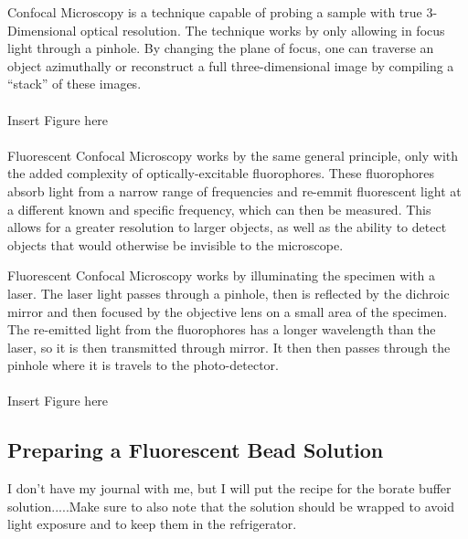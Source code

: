 

Confocal Microscopy is a technique capable of probing a sample with true 3-Dimensional optical resolution. The technique works by only allowing in focus light through a pinhole. By changing the plane of focus, one can traverse an object azimuthally or reconstruct a full three-dimensional image by compiling a ``stack'' of these images.  
\\ \\
	{\large{Insert Figure here} } 
\\ \\
Fluorescent Confocal Microscopy works by the same general principle, only with the added complexity of optically-excitable fluorophores. These fluorophores absorb light from a narrow range of frequencies and re-emmit fluorescent light at a different known and specific frequency, which can then be measured. This allows for a greater resolution to larger objects, as well as the ability to detect objects that would otherwise be invisible to the microscope.  

Fluorescent Confocal Microscopy works by illuminating the specimen with a laser. The laser light passes through a pinhole, then is reflected by the dichroic mirror and then focused by the objective lens on a small area of the specimen. The re-emitted light from the fluorophores has a longer wavelength than the laser, so it is then transmitted through mirror.  It then then passes through the pinhole where it is travels to the photo-detector.
\\ \\
{\large{Insert Figure here} \cite{patent:3013467} } 

\subsection{Preparing a Fluorescent Bead Solution}
I don't have my journal with me, but I will put the recipe for the borate buffer solution.....Make sure to also note that the solution should be wrapped to avoid light exposure and to keep them in the refrigerator. 
\\ \\